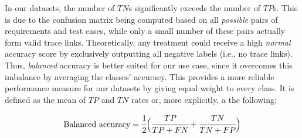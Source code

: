 \documentclass[conference]{IEEEtran}
\renewcommand{\arraystretch}{1.2}
\begin{document}
\begin{table}[h]
    \centering
    \caption{Evaluation metrics in the context of REST alignment}
    \renewcommand{\arraystretch}{1.2}
    \label{tab:eval-metrics-def}
\end{table}

In our datasets, the number of $TN$s significantly exceeds the number of $TP$s. This is due to the confusion matrix being computed based on all \textit{possible} pairs of requirements and test cases, while only a small number of these pairs actually form valid trace links. Theoretically, any treatment could receive a high \textit{normal} accuracy score by exclusively outputting all negative labels (i.e., no trace links). Thus, \textit{balanced} accuracy is better suited for our use case, since it overcomes this imbalance by averaging the classes' accuracy. This provides a more reliable performance measure for our datasets by giving equal weight to every class. It is defined as the mean of $TP$ and $TN$ rates or, more explicitly, a the following:

\[
\text{Balanced accuracy} = \cfrac{1}{2}\Big(\cfrac{TP}{TP + FN} + \cfrac{TN}{TN + FP}\Big)
\]
\end{document}
